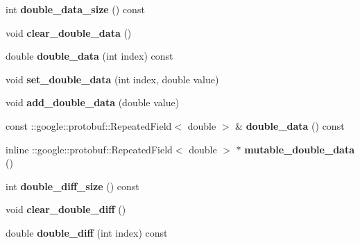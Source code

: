 \begin{DoxyCompactItemize}
\item 
\mbox{\label{classcaffe_1_1_blob_proto_a3d5df825d37362106f54954cf8903a6e}} 
int {\bfseries double\+\_\+data\+\_\+size} () const
\item 
\mbox{\label{classcaffe_1_1_blob_proto_a80a5e7b7a6862b96ae3f440685f3f836}} 
void {\bfseries clear\+\_\+double\+\_\+data} ()
\item 
\mbox{\label{classcaffe_1_1_blob_proto_ada7d284bd39e76a0945e2652796ae6db}} 
double {\bfseries double\+\_\+data} (int index) const
\item 
\mbox{\label{classcaffe_1_1_blob_proto_ab2f6384a20a562b7b4fc0fc6dbe934f7}} 
void {\bfseries set\+\_\+double\+\_\+data} (int index, double value)
\item 
\mbox{\label{classcaffe_1_1_blob_proto_aa0005f45e1560360963fc4b1c5e4dddd}} 
void {\bfseries add\+\_\+double\+\_\+data} (double value)
\item 
\mbox{\label{classcaffe_1_1_blob_proto_a526ef373cbd019e87882cad640ee40fc}} 
const \+::google\+::protobuf\+::\+Repeated\+Field$<$ double $>$ \& {\bfseries double\+\_\+data} () const
\item 
\mbox{\label{classcaffe_1_1_blob_proto_aa7e8f03494d63b7227543656e54e4183}} 
inline \+::google\+::protobuf\+::\+Repeated\+Field$<$ double $>$ $\ast$ {\bfseries mutable\+\_\+double\+\_\+data} ()
\item 
\mbox{\label{classcaffe_1_1_blob_proto_ac96a7bc254eb5f25af0af1bac469a214}} 
int {\bfseries double\+\_\+diff\+\_\+size} () const
\item 
\mbox{\label{classcaffe_1_1_blob_proto_a340f3c671d69448a331825a42d01286c}} 
void {\bfseries clear\+\_\+double\+\_\+diff} ()
\item 
\mbox{\label{classcaffe_1_1_blob_proto_a9ac8514e3f0512b9dfcce06049240160}} 
double {\bfseries double\+\_\+diff} (int index) const

\end{DoxyCompactItemize}
